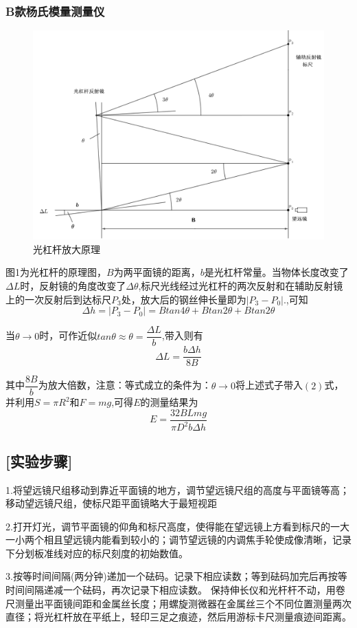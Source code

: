 \documentclass[UTF8]{article} %
\begin{document}
	\subsubsection*{B款杨氏模量测量仪}
		\begin{figure}[h]
			\centering
		\includegraphics[width=0.7\linewidth]{picture2}
		\caption{光杠杆放大原理} %

		
	\end{figure}
	\par 图1为光杠杆的原理图，$B$为两平面镜的距离，$b$是光杠杆常量。当物体长度改变了$\Delta L$时，反射镜的角度改变了$\Delta\theta$,标尺光线经过光杠杆的两次反射和在辅助反射镜上的一次反射后到达标尺$P_3$处，放大后的钢丝伸长量即为$|P_3-P_0|$.,可知
	\[\Delta h = |P_3-P_0| = Btan4\theta+Btan2\theta+Btan2\theta\]

	\par 当$\theta\to0$时，可作近似$tan\theta\approx\theta=\dfrac{\Delta L}{b}$,带入则有
	\[\Delta L = \dfrac{b\Delta h}{8B}\]
	\par 
	\par 其中$\dfrac{8B}{b}$为放大倍数，注意：等式成立的条件为：$\theta\to0$将上述式子带入$(2)$式，并利用$S=\pi R^2$和$F = mg$,可得$E$的测量结果为
	\begin{equation}
		E=\frac{32BLmg}{\pi D^2b\Delta h}
	\end{equation}
	\subsection*{[实验步骤]}
	\par 1.将望远镜尺组移动到靠近平面镜的地方，调节望远镜尺组的高度与平面镜等高；移动望远镜尺组，使标尺距平面镜略大于最短视距
	\par 2.打开灯光，调节平面镜的仰角和标尺高度，使得能在望远镜上方看到标尺的一大一小两个相且望远镜内能看到较小的；调节望远镜的内调焦手轮使成像清晰，记录下分划板准线对应的标尺刻度的初始数值。
	\par 3.按等时间间隔(两分钟)递加一个砝码。记录下相应读数；等到砝码加完后再按等时间间隔递减一个砝码，再次记录下相应读数。 保持伸长仪和光杆杆不动，用卷尺测量出平面镜间距和金属丝长度；用螺旋测微器在金属丝三个不同位置测量两次直径；将光杠杆放在平纸上，轻印三足之痕迹，然后用游标卡尺测量痕迹间距离。
\end{document}
